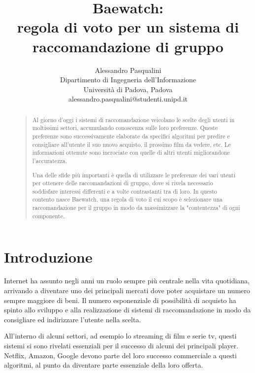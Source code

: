 \documentclass[letterpaper]{article}
\begin{document}
%
\title{Baewatch:\\regola di voto per un sistema di raccomandazione di gruppo}
\author{Alessandro Pasqualini\\
Dipartimento di Ingegneria dell'Informazione\\
Università di Padova, Padova\\
alessandro.pasqualini@studenti.unipd.it\\
}
\maketitle
\begin{abstract}
\begin{quote}
Al giorno d'oggi i sistemi di raccomandazione veicolano le scelte degli utenti in moltissimi settori, accumulando conoscenza sulle loro preferenze. Queste preferenze sono successivamente elaborate da specifici algoritmi per predire e consigliare all'utente il suo nuovo acquisto, il prossimo film da vedere, etc. Le informazioni ottenute sono incrociate con quelle di altri utenti migliorandone l'accuratezza.

Una delle sfide più importanti è quella di utilizzare le preferenze dei vari utenti per ottenere delle raccomandazioni di gruppo, dove si rivela necessario soddisfare interessi differenti e a volte contrastanti tra di loro. In questo contento nasce Baewatch, una regola di voto il cui scopo è selezionare una raccomandazione per il gruppo in modo da massimizzare la "contentezza" di ogni componente.

\end{quote}
\end{abstract}

\section{Introduzione}
Internet ha assunto negli anni un ruolo sempre più centrale nella vita quotidiana, arrivando a diventare uno dei principali mercati dove poter acquistare un numero sempre maggiore di beni. Il numero esponenziale di possibilità di acquisto ha spinto allo sviluppo e alla realizzazione di sistemi di raccomandazione in modo da consigliare ed indirizzare l'utente nella scelta.

All'interno di alcuni settori, ad esempio lo streaming di film e serie tv, questi sistemi si sono rivelati essenziali per il successo di alcuni dei principali player. Netflix, Amazon, Google devono parte del loro successo commerciale a questi algoritmi, al punto da diventare parte essenziale della loro offerta.
\end{document}
